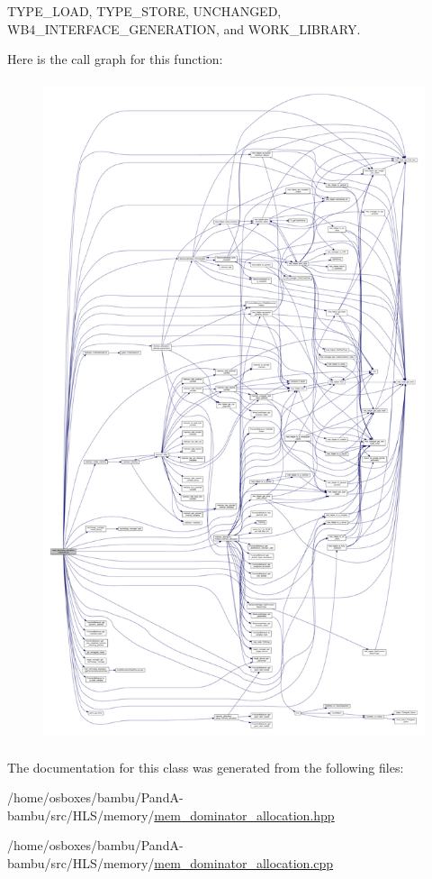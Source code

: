 T\+Y\+P\+E\+\_\+\+L\+O\+AD, T\+Y\+P\+E\+\_\+\+S\+T\+O\+RE, U\+N\+C\+H\+A\+N\+G\+ED, W\+B4\+\_\+\+I\+N\+T\+E\+R\+F\+A\+C\+E\+\_\+\+G\+E\+N\+E\+R\+A\+T\+I\+ON, and W\+O\+R\+K\+\_\+\+L\+I\+B\+R\+A\+RY.

Here is the call graph for this function\+:
\nopagebreak
\begin{figure}[H]
\begin{center}
\leavevmode
\includegraphics[height=550pt]{da/d83/classmem__dominator__allocation_a729c2a36b1495fbccb94e35dd6c433c3_cgraph}
\end{center}
\end{figure}


The documentation for this class was generated from the following files\+:\begin{DoxyCompactItemize}
\item 
/home/osboxes/bambu/\+Pand\+A-\/bambu/src/\+H\+L\+S/memory/\hyperlink{mem__dominator__allocation_8hpp}{mem\+\_\+dominator\+\_\+allocation.\+hpp}\item 
/home/osboxes/bambu/\+Pand\+A-\/bambu/src/\+H\+L\+S/memory/\hyperlink{mem__dominator__allocation_8cpp}{mem\+\_\+dominator\+\_\+allocation.\+cpp}\end{DoxyCompactItemize}
